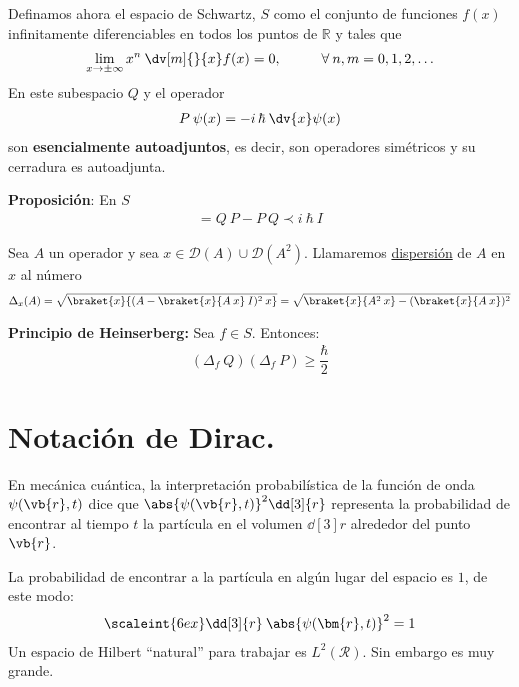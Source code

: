 \begin{ejemplo}
Definamos ahora el espacio de Schwartz, $S$ como el conjunto de funciones $f(x)$ infinitamente diferenciables en todos los puntos de $\mathbb{R}$ y tales que
\begin{align*} \lim_{x \to \pm \infty} x^{n} \: \dv[m]{}{x} f(x) = 0, \hspace{1cm} \forall \: n, m = 0, 1, 2, \ldots \end{align*}
En este subespacio $Q$ y el operador
\begin{align*} P \: \psi (x) = - i \, \hbar \: \dv{x} \psi (x) \end{align*}
son \textbf{esencialmente autoadjuntos}, es decir, son operadores simétricos y su cerradura es autoadjunta.
\end{ejemplo}
\textbf{Proposición}: En $S$
\begin{align*} [Q, P] = Q \: P - P \: Q \prec i \: \hbar \: I \end{align*}
\begin{defi}
Sea $A$ un operador y sea $x \in \mathcal{D}(A) \cup \mathcal{D}(A^{2})$. Llamaremos \underline{dispersión} de $A$ en $x$ al número
\begin{align*} \Delta_{x} (A) = \sqrt{\braket{x}{(A - \braket{x}{A \: x} \: I)^{2} \: x}} = \sqrt{\braket{x}{A^{2} \: x} - (\braket{x}{A \: x})^{2}} \end{align*}
\end{defi}
\textbf{Principio de Heinserberg:} Sea $f \in S$. Entonces:
\begin{align*} (\Delta_{f} \: Q)(\Delta_{f} \: P) \geq \dfrac{\hbar}{2} \end{align*}

\section{Notación de Dirac.}

En mecánica cuántica, la interpretación probabilística de la función de onda $\psi (\vb{r}, t)$ dice que $\abs{\psi (\vb{r}, t)}^{2} \dd[3]{r}$ representa la probabilidad de encontrar al tiempo $t$ la partícula en el volumen $\dd[3]{r}$ alrededor del punto $\vb{r}$.
\par
La probabilidad de encontrar a la partícula en algún lugar del espacio es $1$, de este modo:
\begin{align*}
\scaleint{6ex} \dd[3]{r} \: \abs{\psi (\bm{r}, t)}^{2} = 1
\end{align*}
Un espacio de Hilbert \enquote{natural} para trabajar es $L^{2} (\mathcal{R})$. Sin embargo es muy grande. 

